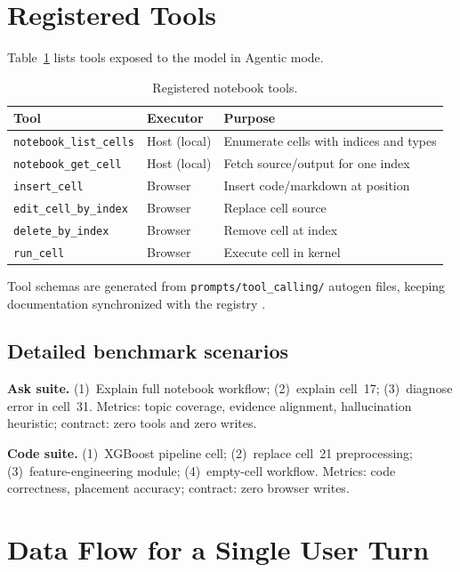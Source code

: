 \section{Registered Tools}
\label{sec:tools-table}

Table~\ref{tab:tools} lists tools exposed to the model in Agentic mode.

\begin{table}[!ht]
\centering
\caption{Registered notebook tools.}
\label{tab:tools}
\small
\begin{tabular}{|p{3.6cm}|p{2.2cm}|p{6.8cm}|}
\hline
\textbf{Tool} & \textbf{Executor} & \textbf{Purpose} \\ \hline
\texttt{notebook\_list\_cells} & Host (local) & Enumerate cells with indices and types \\ \hline
\texttt{notebook\_get\_cell} & Host (local) & Fetch source/output for one index \\ \hline
\texttt{insert\_cell} & Browser & Insert code/markdown at position \\ \hline
\texttt{edit\_cell\_by\_index} & Browser & Replace cell source \\ \hline
\texttt{delete\_by\_index} & Browser & Remove cell at index \\ \hline
\texttt{run\_cell} & Browser & Execute cell in kernel \\ \hline
\end{tabular}
\end{table}

Tool schemas are generated from \texttt{prompts/tool\_calling/} autogen files, keeping documentation synchronized with the registry \parencite{qin2024toolllm,li2023apibank}.

\subsection{Detailed benchmark scenarios}
\label{sec:benchmark-scenarios}

\textbf{Ask suite.} (1)~Explain full notebook workflow; (2)~explain cell~17; (3)~diagnose error in cell~31. Metrics: topic coverage, evidence alignment, hallucination heuristic; contract: zero tools and zero writes.

\textbf{Code suite.} (1)~XGBoost pipeline cell; (2)~replace cell~21 preprocessing; (3)~feature-engineering module; (4)~empty-cell workflow. Metrics: code correctness, placement accuracy; contract: zero browser writes.

\section{Data Flow for a Single User Turn}
\label{sec:data-flow}

